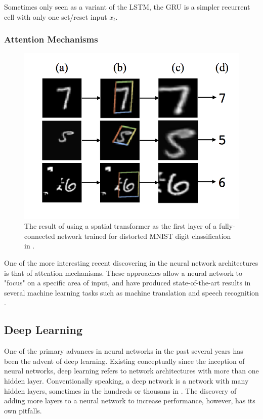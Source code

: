 Sometimes only seen as a variant of the LSTM, the GRU is a simpler recurrent cell with only one set/reset input $x_t$.


\subsubsection{Attention Mechanisms}

\begin{figure}[h]
    \centering
	\includegraphics[width=.4\textwidth]{./images/illustrations/attention}
    \caption{The result of using a spatial transformer as the
first layer of a fully-connected network trained for distorted
MNIST digit classification in \cite{DBLP:journals/corr/JaderbergSZK15}.}
    \label{fig:attention}
\end{figure}



One of the more interesting recent discovering in the neural network architectures is that of attention mechanisms.  These approaches allow a neural network to "focus" on a specific area of input, and have produced state-of-the-art results in several machine learning tasks such as machine translation and speech recognition \cite{DBLP:journals/corr/JaderbergSZK15}.

\subsection{Deep Learning}

One of the primary advances in neural networks in the past several years has been the advent of deep learning.  Existing conceptually since the inception of neural networks, deep learning refers to network architectures with more than one hidden layer.  Conventionally speaking, a deep network is a network with many hidden layers, sometimes in the hundreds or thousans in \cite{DBLP:journals/corr/HeZRS15}. The discovery of adding more layers to a neural network to increase performance, however, has its own pitfalls.

